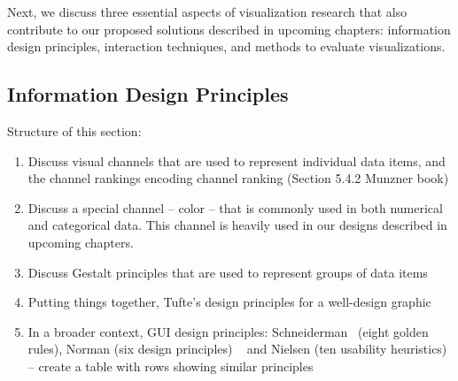 
Next, we discuss three essential aspects of visualization research that also contribute to our proposed solutions described in upcoming chapters: information design principles, interaction techniques, and methods to evaluate visualizations.

\subsection{Information Design Principles}
Structure of this section:

\begin{enumerate}
	\item Discuss visual channels that are used to represent individual data items, and the channel rankings	encoding channel ranking (Section 5.4.2 Munzner book)
	\item Discuss a special channel -- color -- that is commonly used in both numerical and categorical data. This channel is heavily used in our designs described in upcoming chapters.
	\item Discuss Gestalt principles that are used to represent groups of data items
	\item Putting things together, Tufte's design principles for a well-design graphic
	\item In a broader context, GUI design principles:  Schneiderman~\cite{Shneiderman2016} (eight golden rules), Norman (six design principles) ~\cite{Norman2002} and	Nielsen (ten usability heuristics)~\cite{Nielsen1994} -- create a table with rows showing similar principles
\end{enumerate}




